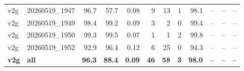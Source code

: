 \begin{table}[t]
\begin{tabular}{llrrrrrrrrrr}
v2g & 20260519\_1947 & 96.7 & 57.7 & 0.08 & 9 & 13 & 1 & 98.1 & -- & -- & -- \\
v2g & 20260519\_1949 & 98.4 & 99.2 & 0.09 & 3 & 2 & 0 & 99.4 & -- & -- & -- \\
v2g & 20260519\_1950 & 99.3 & 99.5 & 0.07 & 1 & 1 & 2 & 99.8 & -- & -- & -- \\
v2g & 20260519\_1952 & 92.9 & 96.4 & 0.12 & 6 & 25 & 0 & 94.3 & -- & -- & -- \\
\textbf{v2g} & \textbf{all} & \textbf{96.3} & \textbf{88.4} & \textbf{0.09} & \textbf{46} & \textbf{58} & \textbf{3} & \textbf{98.0} & \textbf{--} & \textbf{--} & \textbf{--} \\
\bottomrule
\end{tabular}
\end{table}
